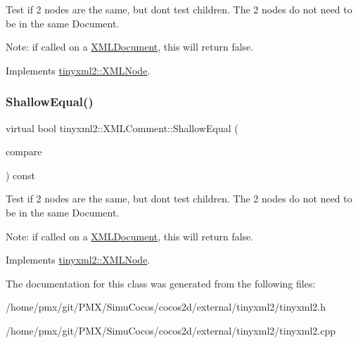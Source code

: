 Test if 2 nodes are the same, but don\textquotesingle{}t test children. The 2 nodes do not need to be in the same Document.

Note\+: if called on a \hyperlink{classtinyxml2_1_1XMLDocument}{X\+M\+L\+Document}, this will return false. 

Implements \hyperlink{classtinyxml2_1_1XMLNode_a7ce18b751c3ea09eac292dca264f9226}{tinyxml2\+::\+X\+M\+L\+Node}.

\mbox{\label{classtinyxml2_1_1XMLComment_a6f7d227b25afa8cc3c763b7cc8833739}} 
\subsubsection{\texorpdfstring{Shallow\+Equal()}{ShallowEqual()}\hspace{0.1cm}{\footnotesize\ttfamily [2/2]}}
{\footnotesize\ttfamily virtual bool tinyxml2\+::\+X\+M\+L\+Comment\+::\+Shallow\+Equal (\begin{DoxyParamCaption}\item[{const \hyperlink{classtinyxml2_1_1XMLNode}{X\+M\+L\+Node} $\ast$}]{compare }\end{DoxyParamCaption}) const\hspace{0.3cm}{\ttfamily [virtual]}}

Test if 2 nodes are the same, but don\textquotesingle{}t test children. The 2 nodes do not need to be in the same Document.

Note\+: if called on a \hyperlink{classtinyxml2_1_1XMLDocument}{X\+M\+L\+Document}, this will return false. 

Implements \hyperlink{classtinyxml2_1_1XMLNode_a7ce18b751c3ea09eac292dca264f9226}{tinyxml2\+::\+X\+M\+L\+Node}.



The documentation for this class was generated from the following files\+:\begin{DoxyCompactItemize}
\item 
/home/pmx/git/\+P\+M\+X/\+Simu\+Cocos/cocos2d/external/tinyxml2/tinyxml2.\+h\item 
/home/pmx/git/\+P\+M\+X/\+Simu\+Cocos/cocos2d/external/tinyxml2/tinyxml2.\+cpp\end{DoxyCompactItemize}
